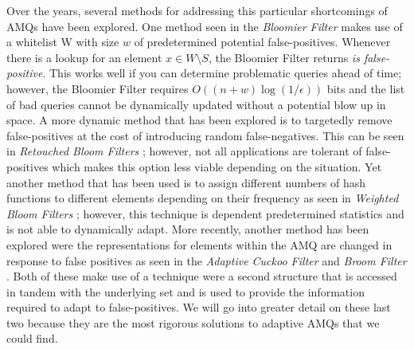 \documentclass[../paper.tex]{subfiles}
\begin{document}
Over the years, several methods for addressing this particular shortcomings of AMQs have been explored.  
One method seen in the {\it Bloomier Filter} \cite{bloomier-filter} makes use of a whitelist 
W with size $w$ of predetermined potential false-positives.  Whenever there is a lookup 
for an element $x \in W \setminus S$, the Bloomier Filter returns \textit{is false-positive}.   
This works well if you can determine problematic queries ahead of time; however, the 
Bloomier Filter requires $O((n+w)\log(1/\epsilon))$ bits and the list of bad queries 
cannot be dynamically updated without a potential blow up in space.   A more dynamic 
method that has been explored is to targetedly remove false-positives at the cost of 
introducing random false-negatives.  This can be seen in {\it Retouched Bloom Filters} 
\cite{retouched-filter}; however, not all applications are tolerant of false-positives 
which makes this option less viable depending on the situation.  Yet another method 
that has been used is to assign different numbers of hash functions to different elements
depending on their frequency as seen in {\it Weighted Bloom Filters} \cite{weighted-filter};
however, this technique is dependent predetermined statistics and is not able to dynamically
adapt.  More recently, another method has been explored were the representations for 
elements within the AMQ are changed in response to false positives as seen in the {\it 
Adaptive Cuckoo Filter} \cite{adaptive-cuckoo} and {\it Broom Filter} \cite{broom-filter}. 
Both of these make use of a technique were a second structure that is accessed in tandem 
with the underlying set and is used to provide the information required to adapt to 
false-positives.  We will go into greater detail on these last two because they are the most
rigorous solutions to adaptive AMQs that we could find.  
\end{document}
